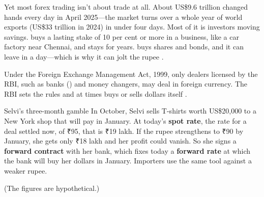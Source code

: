 Yet most forex trading isn't about trade at all. About US\$9.6 trillion changed hands every day in April 2025\cite{bis2025}---the market turns over a whole year of world exports (US\$33 trillion in 2024\cite{unctad2025}) in under four days. Most of it is investors moving savings.  buys a lasting stake of 10 per cent or more in a business, like a car factory near Chennai, and stays for years.  buys shares and bonds, and it can leave in a day---which is why it can jolt the rupee\cite{greenlaw2022} .

Under the Foreign Exchange Management Act, 1999, only dealers licensed by the RBI, such as banks () and money changers, may deal in foreign currency. The RBI sets the rules and at times buys or sells dollars itself .

\begin{casestudy}{Selvi's three-month gamble}
In October, Selvi sells T-shirts worth US\$20,000 to a New York shop that will pay in January. At today's \textbf{spot rate}, the rate for a deal settled now, of ₹95, that is ₹19 lakh. If the rupee strengthens to ₹90 by January, she gets only ₹18 lakh and her profit could vanish. So she signs a \textbf{forward contract} with her bank, which fixes today a \textbf{forward rate} at which the bank will buy her dollars in January. Importers use the same tool against a weaker rupee.

(The figures are hypothetical.)
\end{casestudy}
